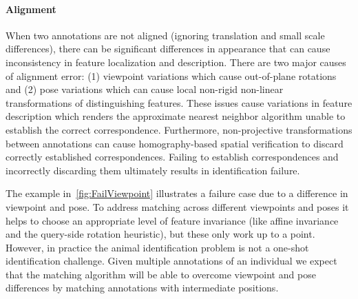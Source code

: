         \FloatBarrier{}
        \paragraph{Alignment}
            
            When two annotations are not aligned (ignoring translation and small scale differences), there can be
            significant differences in appearance that can cause inconsistency in feature localization and
            description. There are two major causes of alignment error: (1) viewpoint variations which cause
            out-of-plane rotations and (2) pose variations which can cause local non-rigid non-linear
            transformations of distinguishing features. These issues cause variations in feature description which
            renders the approximate nearest neighbor algorithm unable to establish the correct correspondence.
            Furthermore, non-projective transformations between annotations can cause homography-based spatial
            verification to discard correctly established correspondences. Failing to establish correspondences and
            incorrectly discarding them ultimately results in identification failure.

            The example in~\cref{fig:FailViewpoint} illustrates a failure case due to a difference in viewpoint and
            pose. To address matching across different viewpoints and poses it helps to choose an appropriate level
            of feature invariance (like affine invariance and the query-side rotation heuristic), but these only
            work up to a point. However, in practice the animal identification problem is not a one-shot
            identification challenge. Given multiple annotations of an individual we expect that the matching
            algorithm will be able to overcome viewpoint and pose differences by matching annotations with
            intermediate positions.

            \FailViewpoint{}

        \FloatBarrier{}

